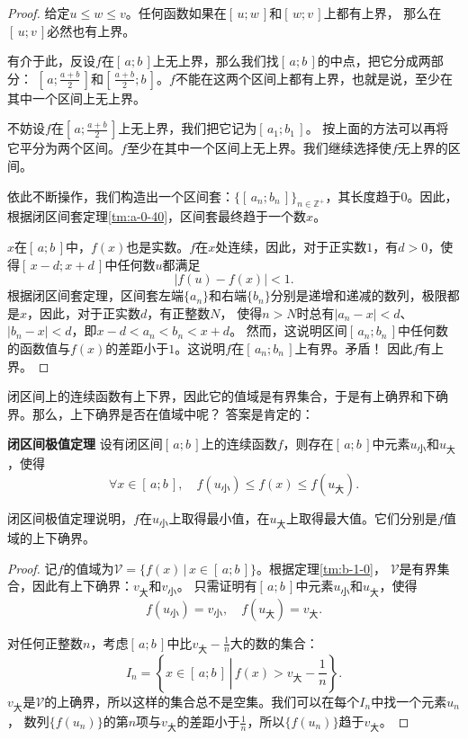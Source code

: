 \documentclass[12pt,UTF8,fontset=none]{ctexbook}
\begin{document}
\begin{appendix}
\begin{proof}
    给定$u \leqslant w \leqslant v$。任何函数如果在$[\,u; w\,]$和$[\,w; v\,]$上都有上界，
    那么在$[\,u; v\,]$必然也有上界。

    有介于此，反设$f$在$[\,a; b\,]$上无上界，那么我们找$[\,a; b\,]$的中点，把它分成两部分：
    $\left[\,a;\frac{a+b}{2}\,\right]$和$\left[\,\frac{a+b}{2}; b\,\right]$。$f$不能在这两个区间上都有上界，也就是说，至少在其中一个区间上无上界。

    不妨设$f$在$\left[\,a;\frac{a+b}{2}\,\right]$上无上界，我们把它记为$[\,a_1; b_1\,]$。
    按上面的方法可以再将它平分为两个区间。$f$至少在其中一个区间上无上界。我们继续选择使$f$无上界的区间。

    依此不断操作，我们构造出一个区间套：$\{[\,a_n;b_n\,]\}_{n\in\mathbb{Z}^+}$，其长度趋于$0$。因此，根据闭区间套定理\ref{tm:a-0-40}，区间套最终趋于一个数$x$。

    $x$在$[\,a; b\,]$中，$f(x)$也是实数。$f$在$x$处连续，因此，对于正实数$1$，有$d>0$，使得$[\,x-d;x+d\,]$中任何数$u$都满足
    $$ |f(u) - f(x)| < 1.$$
    根据闭区间套定理，区间套左端$\{a_n\}$和右端$\{b_n\}$分别是递增和递减的数列，极限都是$x$，因此，对于正实数$d$，有正整数$N$，
    使得$n>N$时总有$|a_n - x| < d$、$|b_n - x| < d$，即$x - d < a_n < b_n < x+d$。
    然而，这说明区间$[\,a_n;b_n\,]$中任何数的函数值与$f(x)$的差距小于$1$。这说明$f$在$[\,a_n;b_n\,]$上有界。矛盾！
    因此$f$有上界。

\end{proof}

闭区间上的连续函数有上下界，因此它的值域是有界集合，于是有上确界和下确界。那么，上下确界是否在值域中呢？
答案是肯定的：
\begin{tm}{\textbf{闭区间极值定理}}\label{tm:b-1-5}
    设有闭区间$[\,a; b\,]$上的连续函数$f$，则存在$[\,a;b\,]$中元素$u_{\text{小}}$和$u_{\text{大}}$，使得
    $$ \forall x\in[\,a;b\,], \quad f(u_{\text{小}}) \leqslant f(x) \leqslant f(u_{\text{大}}).$$
\end{tm}
闭区间极值定理说明，$f$在$u_{\text{小}}$上取得最小值，在$u_{\text{大}}$上取得最大值。它们分别是$f$值域的上下确界。
\begin{proof}
    记$f$的值域为$\mathcal{V} = \{f(x) \, | \, x\in[\,a;b\,]\}$。根据定理\ref{tm:b-1-0}，
    $\mathcal{V}$是有界集合，因此有上下确界：$v_{\text{大}}$和$v_{\text{小}}$。
    只需证明有$[\,a;b\,]$中元素$u_{\text{小}}$和$u_{\text{大}}$，使得
    $$ f(u_{\text{小}}) = v_{\text{小}} , \quad f(u_{\text{大}}) = v_{\text{大}}.$$

    对任何正整数$n$，考虑$[\,a; b\,]$中比$v_{\text{大}} - \frac{1}{n}$大的数的集合：
    $$I_n = \left\{ x\in[\,a;b\,] \, \left| \, f(x) > v_{\text{大}} - \frac{1}{n} \right.\right\}.$$
    $v_{\text{大}}$是$\mathcal{V}$的上确界，所以这样的集合总不是空集。我们可以在每个$I_n$中找一个元素$u_n$，
    数列$\{f(u_n)\}$的第$n$项与$v_{\text{大}}$的差距小于$\frac{1}{n}$，所以$\{f(u_n)\}$趋于$v_{\text{大}}$。


\end{proof}
\end{appendix}
\end{document}
